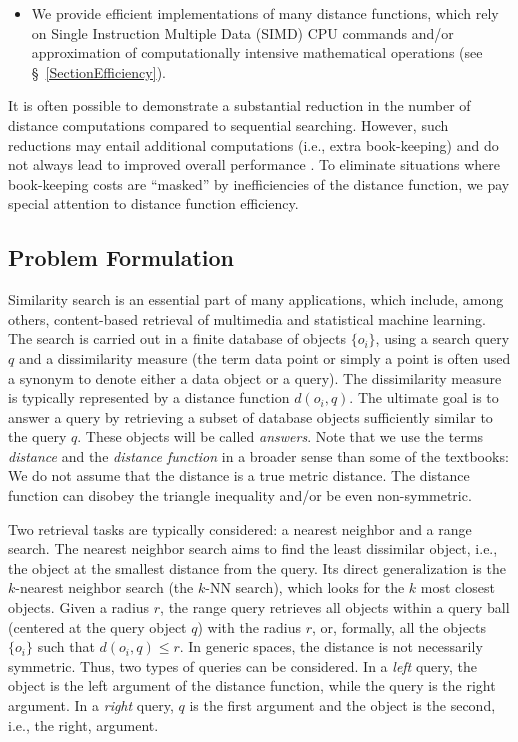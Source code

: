 \documentclass[runningheads,a4paper]{llncs}
\newcommand{\knn}{$k$-NN }
\begin{document}
{\begin{itemize}
\item 
We provide efficient implementations of many distance functions,
which rely on Single Instruction Multiple Data (SIMD) CPU commands  and/or
approximation of computationally intensive mathematical operations (see \S~\ref{SectionEfficiency}). 
\end{itemize}

It is often possible to demonstrate a substantial reduction in the number of distance computations
compared to sequential searching.
However, such reductions may entail additional computations (i.e., extra book-keeping)
and do not always lead to improved overall performance \cite{Boytsov_and_Bilegsaikhan:sisap2013}.
To eliminate situations where book-keeping costs are ``masked''
by inefficiencies of the distance function,
we pay special attention to distance function efficiency.

\subsection{Problem Formulation}
Similarity search is an essential part of many applications,
which include, among others,  
content-based retrieval of multimedia  and statistical machine learning.
The search is carried out in a finite database of objects $\{o_i\}$,
using a search query $q$ and a dissimilarity measure (the term data point or simply a point is often
used a synonym to denote either a data object or a query).
The dissimilarity measure is typically represented by a distance function $d(o_i, q)$. 
The ultimate goal is to answer a query by retrieving a subset of database objects sufficiently similar to the query $q$.
These objects will be called \emph{answers}.
Note that we use the terms \emph{distance} and the \emph{distance function} in a broader sense than
some of the textbooks:
We do not assume that the distance is a true metric distance. 
The distance function can disobey the triangle inequality and/or be even non-symmetric.

Two retrieval tasks are typically considered: a nearest neighbor and a range search. 
The nearest neighbor search aims to find the least dissimilar object,
i.e., the object at the smallest distance from the query.
Its direct generalization is the $k$-nearest neighbor search (the \knn search),
which looks for the $k$ most closest objects.
Given a radius $r$, 
the range query retrieves all objects within a query ball (centered at the query object $q$) with the radius $r$,
or, formally, all the objects~$\lbrace o_i \rbrace$ such that $d(o_i, q) \le r$. 
In generic spaces, the distance is not necessarily symmetric. 
Thus, two types of queries can be considered. 
In a  \emph{left} query, the object is the left argument of the distance function,
while the query is the right argument.
In a \emph{right} query, $q$ is the first argument and the object is the second, i.e.,
the right, argument.

}
\end{document}
